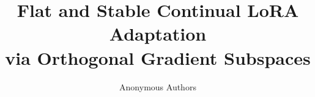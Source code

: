 \documentclass{article}
\title{Flat and Stable Continual LoRA Adaptation\\via Orthogonal Gradient Subspaces}
\author{%
  Anonymous Authors%
}
\theoremstyle{plain}
\theoremstyle{definition}
\theoremstyle{remark}
\begin{document}
\maketitle

\begin{abstract}

\end{abstract}













\newpage
\appendix


\newpage

\end{document}
